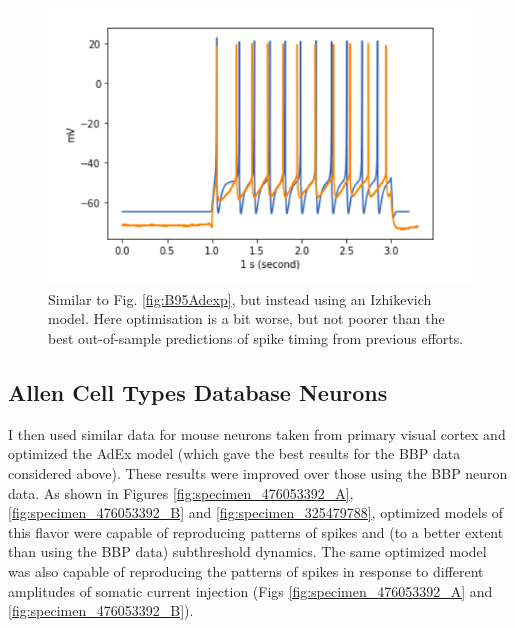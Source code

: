 \begin{figure}
    \centering
    \includegraphics{figures/IZHI_B95.png}
    \caption[Optimized Izhikevich model from BBP]{Similar to Fig. \ref{fig:B95Adexp}, but instead using an Izhikevich model.
    Here optimisation is a bit worse, but not poorer than the best out-of-sample predictions of spike timing from previous efforts.}
    \label{fig:B95_IZHI}
\end{figure}

\subsection{Allen Cell Types Database Neurons}
I then used similar data for mouse neurons taken from primary visual cortex and optimized the AdEx model (which gave the best results for the BBP data considered above).
These results were improved over those using the BBP neuron data.
As shown in Figures \ref{fig:specimen_476053392_A}, \ref{fig:specimen_476053392_B} and \ref{fig:specimen_325479788}, optimized models of this flavor were capable of reproducing patterns of spikes and (to a better extent than using the BBP data) subthreshold dynamics.
The same optimized model was also capable of reproducing the patterns of spikes in response to different amplitudes of somatic current injection (Figs \ref{fig:specimen_476053392_A} and \ref{fig:specimen_476053392_B}).

